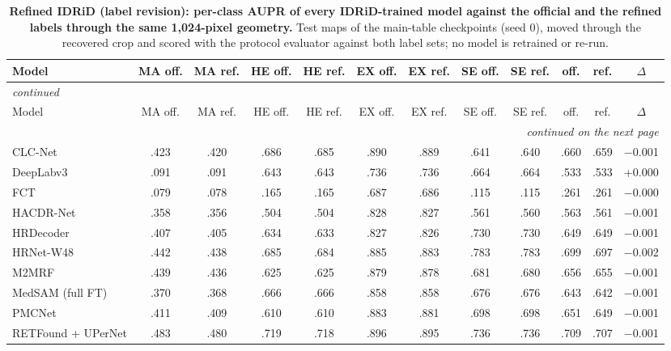 \begin{landscape}
{\scriptsize\setlength{\tabcolsep}{3.2pt}\setlength{\LTcapwidth}{\textwidth}\renewcommand{\arraystretch}{1.08}
\begin{longtable}{l c c c c c c c c c c c}
\caption{\textbf{Refined IDRiD (label revision): per-class AUPR of every IDRiD-trained model against the official and the refined labels through the same 1,024-pixel geometry.} Test maps of the main-table checkpoints (seed 0), moved through the recovered crop and scored with the protocol evaluator against both label sets; no model is retrained or re-run.}\label{stab:refined}\\
\toprule
Model & MA off. & MA ref. & HE off. & HE ref. & EX off. & EX ref. & SE off. & SE ref. & \mAUPR{} off. & \mAUPR{} ref. & $\Delta$ \\
\midrule
\endfirsthead
\multicolumn{12}{l}{\textit{continued}}\\
\toprule
Model & MA off. & MA ref. & HE off. & HE ref. & EX off. & EX ref. & SE off. & SE ref. & \mAUPR{} off. & \mAUPR{} ref. & $\Delta$ \\
\midrule
\endhead
\midrule
\multicolumn{12}{r}{\textit{continued on the next page}}\\
\endfoot
\bottomrule
\endlastfoot
CLC-Net & .423 & .420 & .686 & .685 & .890 & .889 & .641 & .640 & .660 & .659 & $-$0.001 \\
DeepLabv3 & .091 & .091 & .643 & .643 & .736 & .736 & .664 & .664 & .533 & .533 & +0.000 \\
FCT & .079 & .078 & .165 & .165 & .687 & .686 & .115 & .115 & .261 & .261 & $-$0.000 \\
HACDR-Net & .358 & .356 & .504 & .504 & .828 & .827 & .561 & .560 & .563 & .561 & $-$0.001 \\
HRDecoder & .407 & .405 & .634 & .633 & .827 & .826 & .730 & .730 & .649 & .649 & $-$0.001 \\
HRNet-W48 & .442 & .438 & .685 & .684 & .885 & .883 & .783 & .783 & .699 & .697 & $-$0.002 \\
M2MRF & .439 & .436 & .625 & .625 & .879 & .878 & .681 & .680 & .656 & .655 & $-$0.001 \\
MedSAM (full FT) & .370 & .368 & .666 & .666 & .858 & .858 & .676 & .676 & .643 & .642 & $-$0.001 \\
PMCNet & .411 & .409 & .610 & .610 & .883 & .881 & .698 & .698 & .651 & .649 & $-$0.001 \\
RETFound + UPerNet & .483 & .480 & .719 & .718 & .896 & .895 & .736 & .736 & .709 & .707 & $-$0.001 \\

\end{longtable}}
\end{landscape}
